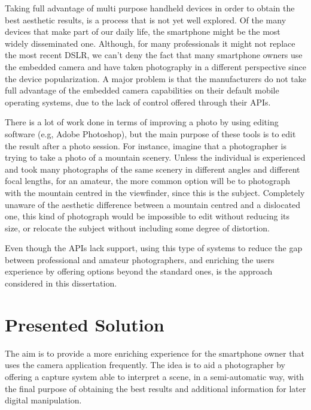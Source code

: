 Taking full advantage of multi purpose handheld devices in order to obtain the best aesthetic results, is a process that is not yet well explored. 
Of the many devices that make part of our daily life, the smartphone might be the most widely disseminated one. Although, for many professionals it might not replace the most recent DSLR, we can't deny the fact that many smartphone owners use the embedded camera and have taken photography in a different perspective since the device popularization. A major problem is that the manufacturers do not take full advantage of the embedded camera capabilities on their default mobile operating systems, due to the lack of control offered through their APIs.

There is a lot of work done in terms of improving a photo by using editing software (e.g, Adobe Photoshop), but the main purpose of these tools is to edit the result after a photo session. For instance, imagine that a photographer is trying to take a photo of a mountain scenery. Unless the individual is experienced and took many photographs of the same scenery in different angles and different focal lengths, for an amateur, the more common option will be to photograph with the mountain centred in the viewfinder, since this is the subject. Completely unaware of the aesthetic difference between a mountain centred and a dislocated one, this kind of photograph would be impossible to edit without reducing its size, or relocate the subject without including some degree of distortion.

Even though the APIs lack  support, using this type of systems to reduce the gap between professional and amateur photographers, and enriching the users experience by offering options beyond the standard ones, is the approach considered in this dissertation.

\section{Presented Solution}

The aim is to provide a more enriching experience for the smartphone owner that uses the camera application frequently. The idea is to aid a photographer by offering a capture system able to interpret a scene, in a semi-automatic way, with the final purpose of obtaining the best results and additional information for later digital manipulation.

